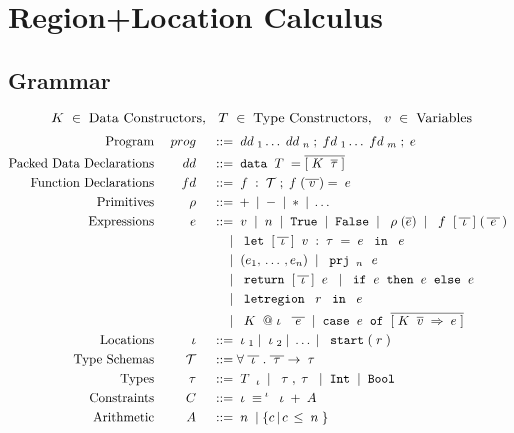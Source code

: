 \documentclass[12pt]{article}
\makeatletter
\newcommand{\gramdef}{\; ::= \;}
\newcommand{\gramor}{\; | \;}
\newcommand{\PROG}{\keywd{prog}}
\newcommand{\EXPR}{\keywd{e}}
\newcommand{\PRIM}{\keywd{\rho}}
\newcommand{\TYP}{\keywd{\tau}}
\newcommand{\STYP}{\keywd{\mathcal{T}}}
\newcommand{\DD}{\keywd{dd}}
\newcommand{\VD}{\keywd{vd}}
\newcommand{\FD}{\keywd{fd}}
\newcommand{\TC}{\keywd{T}}
\newcommand{\DC}{\keywd{K}}
\newcommand{\DATA}{\gramwd{data}}
\newcommand{\sTYP}{\skeywd{\tau}}
\newcommand{\sEXPR}{\skeywd{e}}
\newcommand{\skeywd}[1]{#1}
\newcommand{\keywd}[1]{\; {#1} \;}
\newcommand{\gramwd}[1]{\; \texttt{#1} \;}
\newcommand{\pairtype}[2]{\; {#1}, {#2} \;}
\newcommand{\case}[2]{\gramwd{case}\; #1\; \gramwd{of}\; #2 \;}
\newcommand{\bind}[2]{{#1} \Rightarrow {#2}}
\newcommand{\var}{\; \svar \;}
\newcommand{\svar}{v}
\newcommand{\fvar}{\; \sfvar \;}
\newcommand{\sfvar}{f}
\newcommand{\num}{\; n \;}
\newcommand{\primexpr}[1]{\; \PRIM(#1) \;}
\newcommand{\ife}[3]{\; \gramwd{if}#1\gramwd{then}#2\gramwd{else}#3 \;}
\newcommand{\mapp}[3]{\; #1\;[\,#2\,]\;(\,#3\,) \;}
\newcommand{\return}[2]{\; \gramwd{return}\;[\,#1\,]\;#2\;}
\newcommand{\project}[2]{\; \gramwd{prj}_{#1}\,{#2}\;}
\newcommand{\letlexpr}[4]{\;\gramwd{let} \; [\,#1\,]\; #2 = #3 \; \gramwd{in} \; #3 \;}
\newcommand{\letregion}[2]{\; \gramwd{letregion}\;#1\; \gramwd{in}\; #2 \;}
\newcommand{\mkdata}[3]{\; #1\;#2\;\;#3 \;}
\newcommand{\LOC}{\keywd{\iota}}
\newcommand{\REG}{\keywd{r}}
\newcommand{\atloc}[1]{@#1}
\newcommand{\lstart}[1]{\; \gramwd{start}(#1) \;}
\newcommand{\CONSTR}{\keywd{C}}
\newcommand{\A}{\keywd{A}}
\makeatother
\begin{document}
\section{Region+Location Calculus}
\subsection{Grammar}
\begin{displaymath}
    \DC \in \; \textup{Data Constructors}, \:\: \TC \in \; \textup{Type Constructors}, \:\: \var \in \; \textup{Variables}
\end{displaymath} 
\begin{displaymath}
  \begin{aligned}
      \textup{Program} && \PROG && \gramdef & \DD_1 \ldots \DD_n \; ; 
                          \FD_1 \ldots \FD_m \; ; \EXPR \\
      \textup{Packed Data Declarations} && \DD && \gramdef & \DATA \TC = \overline{[\DC \; \overline{\sTYP}\;]} \\    
      \textup{Function Declarations} && \FD && \gramdef & \fvar : \STYP ; \fvar(\overline{\var}) = \EXPR \\
      \textup{Primitives} && \PRIM && \gramdef & + \gramor - \gramor * \gramor \ldots \\
      \textup{Expressions} && \EXPR && \gramdef & \var \gramor \num \gramor \gramwd{True} \gramor \gramwd{False} \gramor
            \primexpr{\overline{\sEXPR}} \gramor \mapp{\fvar}{\overline{\LOC}}{\overline{\EXPR}} \\
      && && \gramor & \letlexpr{\overline{\LOC}}{\var:\TYP}{\EXPR}{\EXPR} \\
      && && \gramor & \;(e_1,\, \dots\, , e_n)\; \gramor \project{\num}{\EXPR} \\
      && && \gramor & \return{\overline{\LOC}}{\EXPR} \gramor \ife{\EXPR}{\EXPR}{\EXPR} \\
      && && \gramor & \letregion{\REG}{\EXPR} \\
      && && \gramor & \mkdata{\DC}{\atloc{\LOC}}{\overline{\EXPR}} \gramor \case{\sEXPR}{\overline{[\bind{\DC \; \overline{\svar} \;}{\EXPR}]}} \\
      \textup{Locations} && \LOC && \gramdef & \LOC_1 \gramor \LOC_2 \gramor \ldots \gramor \lstart{\REG} \\
      \textup{Type Schemas} && \STYP && \gramdef & \forall\;\overline{\LOC}\;.\;\overline{\TYP}\rightarrow\TYP \\
      \textup{Types} && \TYP && \gramdef & \TC_{\LOC} \gramor \pairtype{\TYP}{\TYP} \gramor \gramwd{Int} \gramor \gramwd{Bool} \\
      \textup{Constraints} && \CONSTR && \gramdef & \LOC \equiv^{\LOC} \LOC + \A \\
      \textup{Arithmetic} && \A && \gramdef & \num \gramor \{ c\, |\, c \, \leq \num \}
  \end{aligned}
\end{displaymath}
\end{document}
